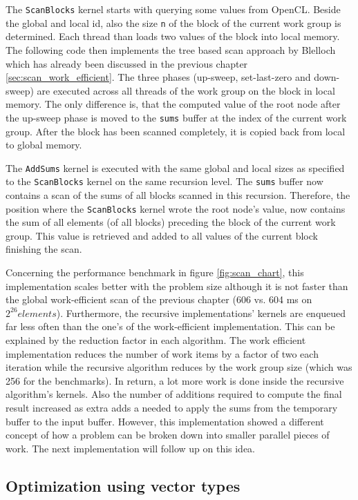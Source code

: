 The \lstinline!ScanBlocks! kernel starts with querying some values from OpenCL. Beside the global and local id, also the size \lstinline!n! of the block of the current work group is determined. Each thread than loads two values of the block into local memory. The following code then implements the tree based scan approach by Blelloch which has already been discussed in the previous chapter \ref{sec:scan_work_efficient}. The three phases (up-sweep, set-last-zero and down-sweep) are executed across all threads of the work group on the block in local memory. The only difference is, that the computed value of the root node after the up-sweep phase is moved to the \lstinline!sums! buffer at the index of the current work group. After the block has been scanned completely, it is copied back from local to global memory.

The \lstinline!AddSums! kernel is executed with the same global and local sizes as specified to the \lstinline!ScanBlocks! kernel on the same recursion level. The \lstinline!sums! buffer now contains a scan of the sums of all blocks scanned in this recursion. Therefore, the position where the \lstinline!ScanBlocks! kernel wrote the root node's value, now contains the sum of all elements (of all blocks) preceding the block of the current work group. This value is retrieved and added to all values of the current block finishing the scan.

Concerning the performance benchmark in figure \ref{fig:scan_chart}, this implementation scales better with the problem size although it is not faster than the global work-efficient scan of the previous chapter (606 vs. 604 ms on $2^{26} elements$). Furthermore, the recursive implementations' kernels are enqueued far less often than the one's of the work-efficient implementation. This can be explained by the reduction factor in each algorithm. The work efficient implementation reduces the number of work items by a factor of two each iteration while the recursive algorithm reduces by the work group size (which was 256 for the benchmarks). In return, a lot more work is done inside the recursive algorithm's kernels. Also the number of additions required to compute the final result increased as extra adds a needed to apply the sums from the temporary buffer to the input buffer.
However, this implementation showed a different concept of how a problem can be broken down into smaller parallel pieces of work. The next implementation will follow up on this idea.

\subsection{Optimization using vector types}
\label{sec:scan_vector}

